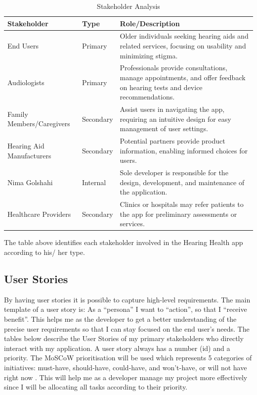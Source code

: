 \documentclass{article}
\begin{document}
\begin{table}[h]
    \centering
    \vspace{10pt}
    \begin{tabular}{|l|l|p{9cm}|}
        \hline
        \textbf{Stakeholder} & \textbf{Type} & \textbf{Role/Description} \\ \hline
        End Users & Primary & Older individuals seeking hearing aids and related services, focusing on usability and minimizing stigma. \\ \hline
        Audiologists & Primary & Professionals provide consultations, manage appointments, and offer feedback on hearing tests and device recommendations. \\ \hline
        Family Members/Caregivers & Secondary & Assist users in navigating the app, requiring an intuitive design for easy management of user settings. \\ \hline
        Hearing Aid Manufacturers & Secondary & Potential partners provide product information, enabling informed choices for users. \\ \hline
        Nima Golshahi & Internal & Sole developer is responsible for the design, development, and maintenance of the application. \\ \hline
        Healthcare Providers & Secondary & Clinics or hospitals may refer patients to the app for preliminary assessments or services. \\ \hline
    \end{tabular}
    \label{tab:stakeholder_analysis}
    \caption{Stakeholder Analysis}
\end{table}

The table above identifies each stakeholder involved in the Hearing Health app according to his/ her type.

\subsection{User Stories}
By having user stories it is possible to capture high-level requirements. The
main template of a user story is: As a “persona” I want to “action”,
so that I “receive benefit”. This helps me as the developer to get a better
understanding of the precise user requirements so that I can stay focused on the end user’s needs. \cite{airfocus2024}
The tables below describe the User Stories of my primary stakeholders who directly interact with my application. A
user story always has a number (id) and a priority. The MoSCoW prioritisation will be used which represents 5 categories of initiatives: must-have,
should-have, could-have, and won’t-have, or will not have right now \cite{productplan2024}. This
will help me as a developer manage my project more effectively since I will be allocating all tasks according to their priority.
\end{document}

